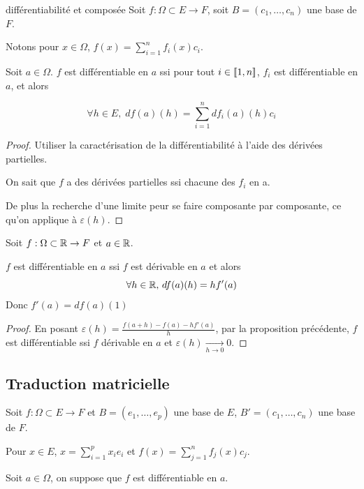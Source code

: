 \begin{proposition}{différentiabilité et composée}{}
    Soit $f : \Omega \subset E \to F$, soit $B = (c_1, \ldots, c_n)$ une base de $F$.

    Notons pour $x \in \Omega$, $\displaystyle f(x) = \sum_{i = 1 }^{n } f_i(x) c_i$.

    Soit $a \in \Omega$. $f$ est différentiable en $a$ ssi pour 
    tout $i \in [\![1, n]\!]$, $f_i$ est différentiable en $a$, et alors 

    $$\forall h \in E, \; \displaystyle df(a)(h) = \sum_{i = 1 }^{n } df_i(a)(h) c_i$$
\end{proposition}

\begin{proof}
    Utiliser la caractérisation de la différentiabilité à l'aide des dérivées partielles.

    On sait que $f$ a des dérivées partielles ssi chacune des $f_i$ en a. 

    De plus la recherche d'une limite peur se faire composante par composante, ce qu'on applique 
    à $\varepsilon(h)$.
\end{proof}

\begin{proposition}{}{}
    Soit $f : \Omega \subset \mathbb{R} \to F$ et $a \in \mathbb{R}$. 

    $f$ est différentiable en $a$ ssi $f$ est dérivable en $a$ et alors 
    $$\forall h \in \mathbb{R}, \, df(a)(h) = h f'(a)$$ Donc $f'(a) = df(a)(1)$
\end{proposition}

\begin{proof}
    En posant $\varepsilon(h) = \displaystyle \frac{f(a + h) - f(a) - h f'(a)}{h}$, par la 
    proposition précédente, $f$ est différentiable ssi $f$ dérivable en $a$ et $\varepsilon(h) \xrightarrow[h \to 0 ]{} 0$.
\end{proof}

\subsection{Traduction matricielle }


Soit $f : \Omega \subset E \to F$ et $B = (e_1, \ldots, e_p)$ une base de $E$,
$B' = (c_1, \ldots, c_n)$ une base de $F$.

Pour $x \in E$, $\displaystyle x = \sum_{i = 1 }^{p } x_i e_i$ et 
$\displaystyle f(x) = \sum_{j = 1 }^{n } f_j(x) c_j$.

Soit $a \in \Omega$, on suppose que $f$ est différentiable en $a$. 

